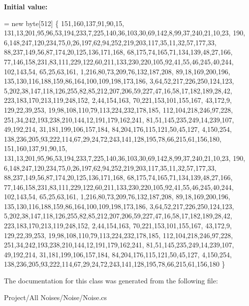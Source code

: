 {\bfseries Initial value\+:}
\begin{DoxyCode}
= \textcolor{keyword}{new} byte[512] \{ 151,160,137,91,90,15,
              131,13,201,95,96,53,194,233,7,225,140,36,103,30,69,142,8,99,37,240,21,10,23,
              190, 6,148,247,120,234,75,0,26,197,62,94,252,219,203,117,35,11,32,57,177,33,
              88,237,149,56,87,174,20,125,136,171,168, 68,175,74,165,71,134,139,48,27,166,
              77,146,158,231,83,111,229,122,60,211,133,230,220,105,92,41,55,46,245,40,244,
              102,143,54, 65,25,63,161, 1,216,80,73,209,76,132,187,208, 89,18,169,200,196,
              135,130,116,188,159,86,164,100,109,198,173,186, 3,64,52,217,226,250,124,123,
              5,202,38,147,118,126,255,82,85,212,207,206,59,227,47,16,58,17,182,189,28,42,
              223,183,170,213,119,248,152, 2,44,154,163, 70,221,153,101,155,167, 43,172,9,
              129,22,39,253, 19,98,108,110,79,113,224,232,178,185, 112,104,218,246,97,228,
              251,34,242,193,238,210,144,12,191,179,162,241, 81,51,145,235,249,14,239,107,
              49,192,214, 31,181,199,106,157,184, 84,204,176,115,121,50,45,127, 4,150,254,
              138,236,205,93,222,114,67,29,24,72,243,141,128,195,78,66,215,61,156,180,
              151,160,137,91,90,15,
              131,13,201,95,96,53,194,233,7,225,140,36,103,30,69,142,8,99,37,240,21,10,23,
              190, 6,148,247,120,234,75,0,26,197,62,94,252,219,203,117,35,11,32,57,177,33,
              88,237,149,56,87,174,20,125,136,171,168, 68,175,74,165,71,134,139,48,27,166,
              77,146,158,231,83,111,229,122,60,211,133,230,220,105,92,41,55,46,245,40,244,
              102,143,54, 65,25,63,161, 1,216,80,73,209,76,132,187,208, 89,18,169,200,196,
              135,130,116,188,159,86,164,100,109,198,173,186, 3,64,52,217,226,250,124,123,
              5,202,38,147,118,126,255,82,85,212,207,206,59,227,47,16,58,17,182,189,28,42,
              223,183,170,213,119,248,152, 2,44,154,163, 70,221,153,101,155,167, 43,172,9,
              129,22,39,253, 19,98,108,110,79,113,224,232,178,185, 112,104,218,246,97,228,
              251,34,242,193,238,210,144,12,191,179,162,241, 81,51,145,235,249,14,239,107,
              49,192,214, 31,181,199,106,157,184, 84,204,176,115,121,50,45,127, 4,150,254,
              138,236,205,93,222,114,67,29,24,72,243,141,128,195,78,66,215,61,156,180
            \}
\end{DoxyCode}


The documentation for this class was generated from the following file\+:\begin{DoxyCompactItemize}
\item 
Project/\+All Noises/\+Noise/Noise.\+cs\end{DoxyCompactItemize}
